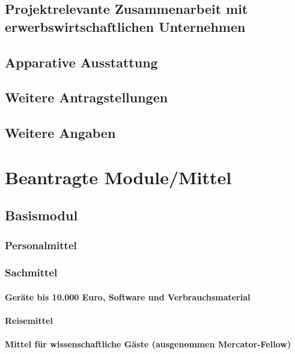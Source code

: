 \documentclass[de]{dfg-proposal}
\begin{document}
        \subsection{Projektrelevante Zusammenarbeit mit erwerbswirtschaftlichen Unternehmen}

        \subsection{Apparative Ausstattung}

        \subsection{Weitere Antragstellungen}

        \subsection{Weitere Angaben}


    \section{Beantragte Module/Mittel}

        \subsection{Basismodul}

            \subsubsection{Personalmittel}

            \subsubsection{Sachmittel}

                \paragraph{Geräte bis 10.000 Euro, Software und Verbrauchsmaterial}

                \paragraph{Reisemittel}

                \paragraph{Mittel für wissenschaftliche Gäste (ausgenommen Mercator-Fellow)}
\end{document}
